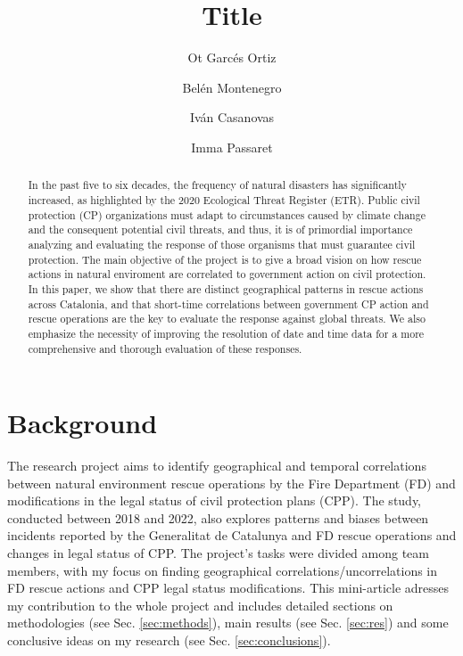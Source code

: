 \documentclass[
  journal=small,
  manuscript=mini-article,  %
  year=2023,
  volume=1,
]{odj-journal}
\title{Title}
\author{Ot Garcés Ortiz}
\affiliation{MSc Physics of Complex Systems and Biophysics}
\author{Belén Montenegro}
\affiliation{MSc Physics of Complex Systems and Biophysics}
\author{Iván Casanovas}
\affiliation{MSc Physics of Complex Systems and Biophysics}
\author{Imma Passaret}
\affiliation{MSc Physics of Complex Systems and Biophysics}
\begin{document}
\begin{abstract}
In the past five to six decades, the frequency of natural disasters has significantly increased, as highlighted by the 2020 Ecological Threat Register (ETR). Public civil protection (CP) organizations must adapt to circumstances caused by climate change and the consequent potential civil threats, and thus, it is of primordial importance analyzing and evaluating the response of those organisms that must guarantee civil protection. The main objective of the project is to give a broad vision on how rescue actions in natural enviroment are correlated to government action on civil protection. In this paper, we show that there are distinct geographical patterns in rescue actions across Catalonia, and that short-time correlations between government CP action and rescue operations are the key to evaluate the response against global threats. We also emphasize the necessity of improving the resolution of date and time data for a more comprehensive and thorough evaluation of these responses.
\end{abstract}
\vspace{-1cm}
\section{Background}
The research project aims to identify geographical and temporal correlations between natural environment rescue operations by the Fire Department (FD) and modifications in the legal status of civil protection plans (CPP). The study, conducted between 2018 and 2022, also explores patterns and biases between incidents reported by the Generalitat de Catalunya and FD rescue operations and changes in legal status of CPP. The project's tasks were divided among team members, with my focus on finding geographical correlations/uncorrelations in FD rescue actions and CPP legal status modifications. This mini-article adresses my contribution to the whole project and includes detailed sections on methodologies (see Sec. \ref{sec:methods}), main results (see Sec. \ref{sec:res}) and some conclusive ideas on my research (see Sec. \ref{sec:conclusions}). \\
\end{document}
